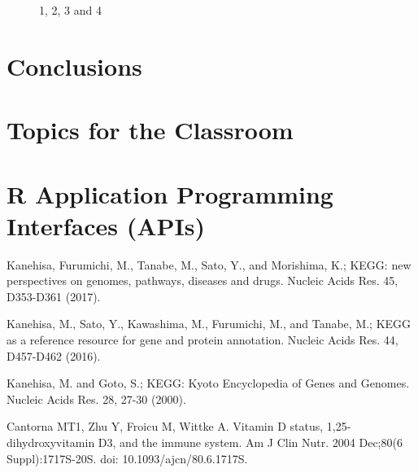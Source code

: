 \begin{figure}[H]
	\centering
	\begin{minipage}[b]{0.5\linewidth}
	\end{minipage}\hfill
	\begin{minipage}[b]{0.5\linewidth}
	\end{minipage}\hfill	
	\begin{minipage}[b]{0.5\linewidth}
	\end{minipage}\hfill
	\begin{minipage}[b]{0.5\linewidth}
	\end{minipage}\hfill
	\caption{1, 2, 3 and 4}
	\label{fig:Figure1}
\end{figure} 



\section{Conclusions}

\section{Topics for the Classroom}

\begin{enumerate}
\end{enumerate}


\section{R Application Programming Interfaces (APIs)}



\begin{thebibliography}{00}

 Kanehisa, Furumichi, M., Tanabe, M., Sato, Y., and Morishima, K.; 
\newblock KEGG: new perspectives on genomes, pathways, diseases and drugs. 
\newblock Nucleic Acids Res. 45, D353-D361 (2017).

 Kanehisa, M., Sato, Y., Kawashima, M., Furumichi, M., and Tanabe, M.; 
\newblock KEGG as a reference resource for gene and protein annotation. 
\newblock Nucleic Acids Res. 44, D457-D462 (2016).

 Kanehisa, M. and Goto, S.; 
\newblock KEGG: Kyoto Encyclopedia of Genes and Genomes. 
\newblock Nucleic Acids Res. 28, 27-30 (2000). 

 Cantorna MT1, Zhu Y, Froicu M, Wittke A.
\newblock Vitamin D status, 1,25-dihydroxyvitamin D3, and the immune system.
\newblock Am J Clin Nutr. 2004 Dec;80(6 Suppl):1717S-20S. doi: 10.1093/ajcn/80.6.1717S.

\end{thebibliography}

